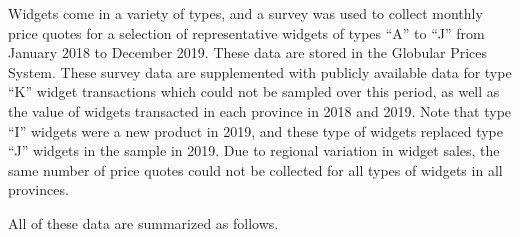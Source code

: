 \documentclass[]{article}
\begin{document}
Widgets come in a variety of types, and a survey was used to collect monthly price quotes for a selection of representative widgets of types ``A'' to ``J'' from January 2018 to December 2019. These data are stored in the Globular Prices System. These survey data are supplemented with publicly available data for type ``K'' widget transactions which could not be sampled over this period, as well as the value of widgets transacted in each province in 2018 and 2019. Note that type ``I'' widgets were a new product in 2019, and these type of widgets replaced type ``J'' widgets in the sample in 2019. Due to regional variation in widget sales, the same number of price quotes could not be collected for all types of widgets in all provinces.

All of these data are summarized as follows.
\end{document}
